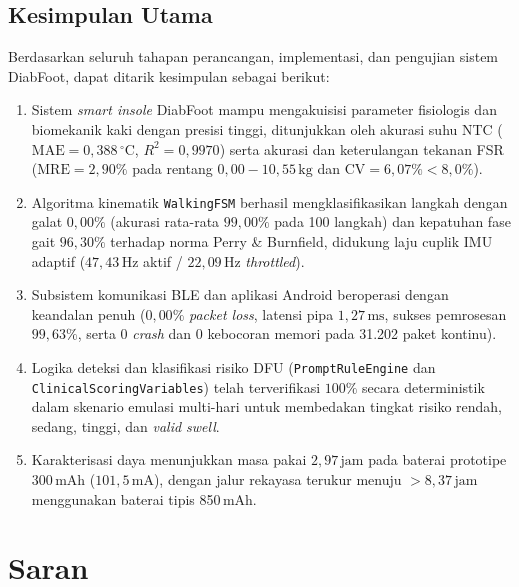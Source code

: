 \subsection{Kesimpulan Utama}
\label{subsec:kesimpulan_utama}

Berdasarkan seluruh tahapan perancangan, implementasi, dan pengujian sistem DiabFoot, dapat ditarik kesimpulan sebagai berikut:
\begin{enumerate}
    \item Sistem \textit{smart insole} DiabFoot mampu mengakuisisi parameter fisiologis dan biomekanik kaki dengan presisi tinggi, ditunjukkan oleh akurasi suhu NTC ($\mathrm{MAE} = 0{,}388\,^\circ\mathrm{C}$, $R^2 = 0{,}9970$) serta akurasi dan keterulangan tekanan FSR ($\mathrm{MRE} = 2{,}90\%$ pada rentang $0{,}00 - 10{,}55\,\mathrm{kg}$ dan $\mathrm{CV} = 6{,}07\% < 8{,}0\%$).
    \item Algoritma kinematik \texttt{WalkingFSM} berhasil mengklasifikasikan langkah dengan galat $0{,}00\%$ (akurasi rata-rata $99{,}00\%$ pada 100 langkah) dan kepatuhan fase gait $96{,}30\%$ terhadap norma Perry \& Burnfield, didukung laju cuplik IMU adaptif ($47{,}43\,\mathrm{Hz}$ aktif / $22{,}09\,\mathrm{Hz}$ \textit{throttled}).
    \item Subsistem komunikasi BLE dan aplikasi Android beroperasi dengan keandalan penuh ($0{,}00\%$ \textit{packet loss}, latensi pipa $1{,}27\,\mathrm{ms}$, sukses pemrosesan $99{,}63\%$, serta 0 \textit{crash} dan 0 kebocoran memori pada 31.202 paket kontinu).
    \item Logika deteksi dan klasifikasi risiko DFU (\texttt{PromptRuleEngine} dan \texttt{ClinicalScoringVariables}) telah terverifikasi $100\%$ secara deterministik dalam skenario emulasi multi-hari untuk membedakan tingkat risiko rendah, sedang, tinggi, dan \textit{valid swell}.
    \item Karakterisasi daya menunjukkan masa pakai $2{,}97\,\mathrm{jam}$ pada baterai prototipe 300\,mAh ($101{,}5\,\mathrm{mA}$), dengan jalur rekayasa terukur menuju $> 8{,}37\,\mathrm{jam}$ menggunakan baterai tipis 850\,mAh.
\end{enumerate}

\section{Saran}
\label{sec:saran}

